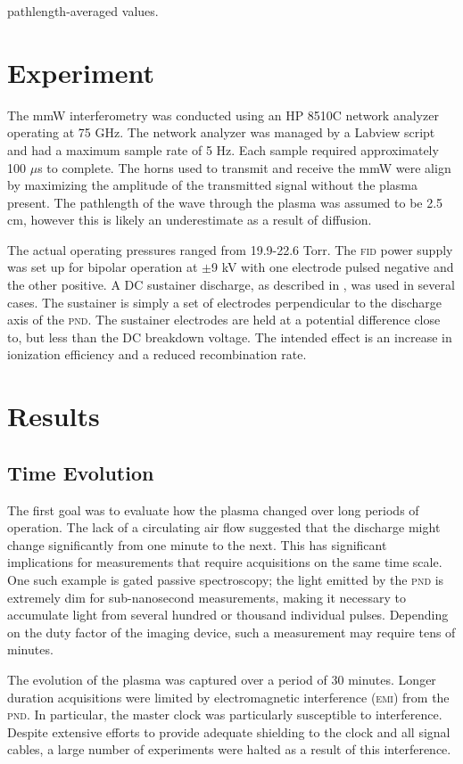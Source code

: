 pathlength-averaged values.

\section{Experiment}
    The mmW interferometry was conducted using an HP 8510C network analyzer operating at 75 GHz. The network analyzer was managed by a Labview script and had a maximum sample rate of 5 Hz. Each sample required approximately 100 $\mu$s to complete. The horns used to transmit and receive the mmW were align by maximizing the amplitude of the transmitted signal without the plasma present. The pathlength of the wave through the plasma was assumed to be 2.5 cm, however this is likely an underestimate as a result of diffusion.

    The actual operating pressures ranged from 19.9-22.6 Torr. The \textsc{fid} power supply was set up for bipolar operation at $\pm$9 kV with one electrode pulsed negative and the other positive. A DC sustainer discharge, as described in \cite{Schneider2009a}, was used in several cases. The sustainer is simply a set of electrodes perpendicular to the discharge axis of the \textsc{pnd}. The sustainer electrodes are held at a potential difference close to, but less than the DC breakdown voltage. The intended effect is an increase in ionization efficiency and a reduced recombination rate.
\section{Results}
    \subsection{Time Evolution}
        The first goal was to evaluate how the plasma changed over long periods of operation. The lack of a circulating air flow suggested that the discharge might change significantly from one minute to the next. This has significant implications for measurements that require acquisitions on the same time scale. One such example is gated passive spectroscopy; the light emitted by the \textsc{pnd} is extremely dim for sub-nanosecond measurements, making it necessary to accumulate light from several hundred or thousand individual pulses. Depending on the duty factor of the imaging device, such a measurement may require tens of minutes.

        The evolution of the plasma was captured over a period of 30 minutes. Longer duration acquisitions were limited by electromagnetic interference (\textsc{emi}) from the \textsc{pnd}. In particular, the master clock was particularly susceptible to interference. Despite extensive efforts to provide adequate shielding to the clock and all signal cables, a large number of experiments were halted as a result of this interference.

